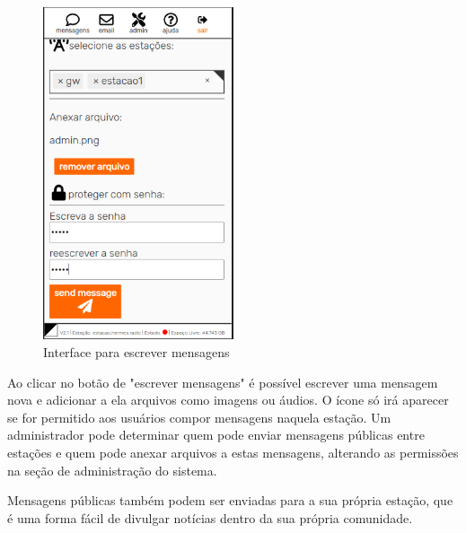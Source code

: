 \documentclass[11pt,a4paper]{article}
\begin{document}
\begin{figure}[H]
    \centering
    \includegraphics[width=0.5\textwidth]{screenshots/frontend/pt_kn/publicas2.png}
    \caption{Interface para escrever mensagens}
    \label{fig:compose2}
\end{figure}

Ao clicar no botão de "escrever mensagens"
é possível escrever uma mensagem nova e adicionar a ela arquivos como imagens ou áudios. O ícone só irá aparecer se for permitido aos usuários compor mensagens naquela estação. Um administrador pode determinar quem pode enviar mensagens públicas entre estações e quem pode anexar arquivos a estas mensagens, alterando as permissões na seção de administração do sistema.



Mensagens públicas também podem ser enviadas para a sua própria estação, que é uma forma fácil de divulgar notícias dentro da sua própria comunidade. 
\end{document}
